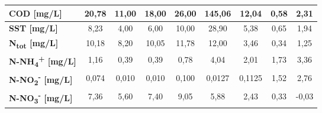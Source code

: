 \begin{sidewaystable}[h]
\begin{center}
\begin{tabular}{lcccccccc}
		\multicolumn{1}{|l|}{\textbf{COD {[}mg/L{]}}}           & \multicolumn{1}{c|}{20,78}          & \multicolumn{1}{c|}{11,00}                   & \multicolumn{1}{c|}{18,00}            & \multicolumn{1}{c|}{26,00}                   & \multicolumn{1}{c|}{145,06}            & \multicolumn{1}{c|}{12,04}             & \multicolumn{1}{c|}{0,58}        & \multicolumn{1}{c|}{2,31}           \\ \hline
		\multicolumn{1}{|l|}{\textbf{SST {[}mg/L{]}}}           & \multicolumn{1}{c|}{8,23}           & \multicolumn{1}{c|}{4,00}                    & \multicolumn{1}{c|}{6,00}             & \multicolumn{1}{c|}{10,00}                   & \multicolumn{1}{c|}{28,90}             & \multicolumn{1}{c|}{5,38}              & \multicolumn{1}{c|}{0,65}        & \multicolumn{1}{c|}{1,94}           \\ \hline
		\multicolumn{1}{|l|}{\textbf{N\textsubscript{tot} {[}mg/L{]}}}          & \multicolumn{1}{c|}{10,18}          & \multicolumn{1}{c|}{8,20}                    & \multicolumn{1}{c|}{10,05}            & \multicolumn{1}{c|}{11,78}                   & \multicolumn{1}{c|}{12,00}             & \multicolumn{1}{c|}{3,46}              & \multicolumn{1}{c|}{0,34}        & \multicolumn{1}{c|}{1,25}           \\ \hline
		\multicolumn{1}{|l|}{\textbf{N-NH\textsubscript{4}\textsuperscript{+} {[}mg/L{]}}}        & \multicolumn{1}{c|}{1,16}           & \multicolumn{1}{c|}{0,39}                    & \multicolumn{1}{c|}{0,39}             & \multicolumn{1}{c|}{0,78}                    & \multicolumn{1}{c|}{4,04}              & \multicolumn{1}{c|}{2,01}              & \multicolumn{1}{c|}{1,73}        & \multicolumn{1}{c|}{3,36}           \\ \hline
		\multicolumn{1}{|l|}{\textbf{N-NO\textsubscript{2}\textsuperscript{-} {[}mg/L{]}}}        & \multicolumn{1}{c|}{0,074}          & \multicolumn{1}{c|}{0,010}                   & \multicolumn{1}{c|}{0,010}            & \multicolumn{1}{c|}{0,100}                   & \multicolumn{1}{c|}{0,0127}            & \multicolumn{1}{c|}{0,1125}            & \multicolumn{1}{c|}{1,52}        & \multicolumn{1}{c|}{2,76}           \\ \hline
		\multicolumn{1}{|l|}{\textbf{N-NO\textsubscript{3}\textsuperscript{-} {[}mg/L{]}}}        & \multicolumn{1}{c|}{7,36}           & \multicolumn{1}{c|}{5,60}                    & \multicolumn{1}{c|}{7,40}             & \multicolumn{1}{c|}{9,05}                    & \multicolumn{1}{c|}{5,88}              & \multicolumn{1}{c|}{2,43}              & \multicolumn{1}{c|}{0,33}        & \multicolumn{1}{c|}{-0,03}          \\ \hline

\end{tabular}
\end{center}
\end{sidewaystable}
